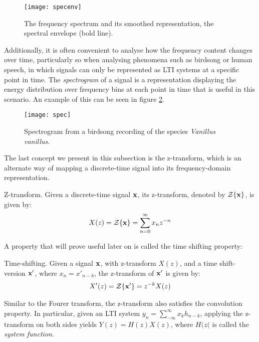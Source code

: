 \documentclass[../main.tex]{subfiles}
\begin{document}
\begin{figure}[t]
\centering
\texttt{[image: specenv]}
\caption{The frequency spectrum and its smoothed representation, the spectral envelope (bold line).}
\label{fig_specenv}
\end{figure}
\par Additionally, it is often convenient to analyse how the frequency content changes over time, particularly so when analysing phenomena such as birdsong or human speech, in which signals can only be represented as LTI systems at a specific point in time. The \emph{spectrogram} of a signal is a representation displaying the energy distribution over frequency bins at each point in time that is useful in this scenario. An example of this can be seen in figure \ref{fig_spec}.
\begin{figure}[t]
\centering
\texttt{[image: spec]}
\caption{Spectrogram from a birdsong recording of the species \emph{Vanillus vanillus}.}
\label{fig_spec}
\end{figure}
\par The last concept we present in this subsection is the z-transform, which is an alternate way of mapping a discrete-time signal into its frequency-domain representation. 
\begin{definition}{Z-transform.} \label{def_ztransform}
Given a discrete-time signal $\mathbf{x}$, its z-transform, denoted by $\mathcal{Z}\{\mathbf{x}\}$, is given by:
\begin{align*}
X(z) = \mathcal{Z}\{\mathbf{x}\} = \sum_{n=0}^\infty{x_nz^{-n}}
\end{align*}
\end{definition}
\par A property that will prove useful later on is called the time shifting property:
\begin{definition}{Time-shifting.} \label{def_timeshitfing}
Given a signal $\mathbf{x}$, with z-transform $X(z)$, and a time shift-version $\mathbf{x}'$, where $x_n = x'_{n-k}$, the z-transform of $\mathbf{x}'$ is given by:
\begin{align*}
X'(z) = \mathcal{Z}\{\mathbf{x}'\} = z^{-k}X(z)
\end{align*}
\end{definition}
\par Similar to the Fourer transform, the z-transform also satisfies the convolution property. In particular, given an LTI system $y_n = \sum_{-\infty}^\infty{x_kh_{n-k}}$, applying the z-transform on both sides yields $Y(z) = H(z)X(z)$, where $H(z($ is called the \emph{system function}.
\end{document}
